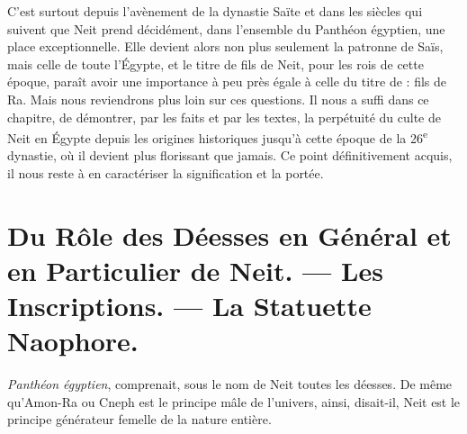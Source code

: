 \documentclass[letterpaper,twocolumn,openany,nodeprecatedcode]{dndbook}
\begin{document}
C'est surtout depuis l'avènement de la dynastie Saïte et dans les siècles qui suivent que Neit prend décidément, dans l'ensemble du Panthéon égyptien, une place exceptionnelle. Elle devient alors non plus seulement la patronne de Saïs, mais celle de toute l'Égypte, et le titre de fils de Neit, pour les rois de cette époque, paraît avoir une importance à peu près égale à celle du titre de : fils de Ra. Mais nous reviendrons plus loin sur ces questions. Il nous a suffi dans ce chapitre, de démontrer, par les faits et par les textes, la perpétuité du culte de Neit en Égypte depuis les origines historiques jusqu'à cette époque de la 26\textsuperscript{e} dynastie, où il devient plus florissant que jamais. Ce point définitivement acquis, il nous reste à en caractériser la signification et la portée.
\clearpage
\chapter{Du Rôle des Déesses en Général et en Particulier de Neit. --- Les Inscriptions. --- La Statuette Naophore.}
 \emph{Panthéon égyptien}, comprenait, sous le nom de Neit toutes les déesses. De même qu'Amon-Ra ou Cneph est le principe mâle de l'univers, ainsi, disait-il, Neit est le principe générateur femelle de la nature entière.
\end{document}
